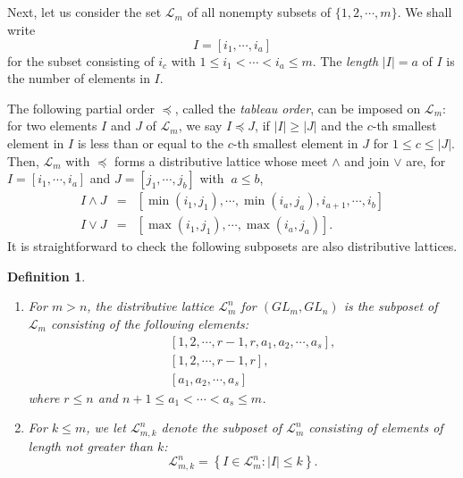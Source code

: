 \documentclass[11pt]{amsart}
\numberwithin{equation}{subsection}
\newtheorem{definition}[theorem]{Definition}
\begin{document}
\medskip

\subsection{}\label{Sec_taborder}
Next, let us consider the set $\mathcal{L}_{m}$ of all nonempty 
subsets of $\{1,2,\cdots ,m\}$. We shall write
\begin{equation*}
I=[i_{1},\cdots ,i_{a}]
\end{equation*}
for the subset consisting of $i_{c}$ with $1\leq i_{1}<\cdots <i_{a}\leq m$.
The \textit{length} $|I|=a$ of $I$ is the number of elements in $I$.

\medskip

The following partial order $\preceq$, called the \textit{tableau order}, can be
imposed on $\mathcal{L}_{m}$: for two elements $I$ and $J$ of $\mathcal{L}_m$, we say $I\preceq
J$, if $|I| \geq |J|$ and the $c$-th smallest
element in $I$ is less than or equal to the $c$-th smallest element in 
$J$ for $1\leq c\leq |J|$. 
Then, $\mathcal{L}_{m}$ with $\preceq $ forms a distributive lattice 
whose meet $\wedge $ and join $\vee $ are, 
for $I=[i_{1},\cdots ,i_{a}]$ and $J=[j_{1},\cdots ,j_{b}]$ with $\ a\leq b$, 
\begin{eqnarray*}
I\wedge J &=&[\min (i_{1},j_{1}),\cdots ,\min (i_{a},j_{a}),i_{a+1},
\cdots,i_{b}] \\
I\vee J &=&[\max (i_{1},j_{1}),\cdots ,\max (i_{a},j_{a})].
\end{eqnarray*}
It is straightforward to check the following subposets are also distributive lattices.

\begin{definition}\label{columnDL}
\begin{enumerate}
 \item  For $m>n$, the distributive lattice $\mathcal{L}_{m}^{n}$
for $({GL}_{m},{GL}_{n})$ is the subposet of $\mathcal{L}_{m}$ consisting of
the following elements:
\begin{eqnarray*}
&&[1,2,\cdots ,r-1, r,a_{1},a_{2},\cdots ,a_{s}], \\
&&[1,2,\cdots ,r-1, r], \\
&&[a_{1},a_{2},\cdots ,a_{s}]
\end{eqnarray*}
where $r\leq n$ and $n+1\leq a_1 < \cdots < a_s \leq m$.

 \item For $k\leq m$, we let $\mathcal{L}_{m,k}^{n}$ denote 
the subposet of $\mathcal{L}_{m}^{n}$ consisting of elements of length not greater than $k$:
\begin{equation*}
\mathcal{L}_{m,k}^{n}=\left\{ I\in \mathcal{L}_{m}^{n}: 
|I|\leq k \right\}.
\end{equation*}
\end{enumerate}
\end{definition}
\end{document}

